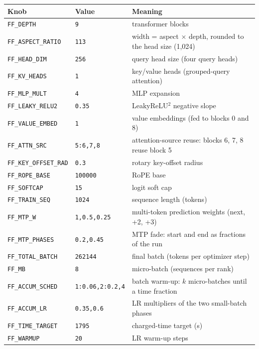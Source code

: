 {\footnotesize
\begin{tabular}{@{}lp{3.2cm}p{7.6cm}@{}}
\toprule
Knob & Value & Meaning \\
\midrule
\texttt{FF\_DEPTH} & \texttt{9} & transformer blocks \\
\texttt{FF\_ASPECT\_RATIO} & \texttt{113} & width = aspect $\times$ depth, rounded to the head size (1{,}024) \\
\texttt{FF\_HEAD\_DIM} & \texttt{256} & query head size (four query heads) \\
\texttt{FF\_KV\_HEADS} & \texttt{1} & key/value heads (grouped-query attention) \\
\texttt{FF\_MLP\_MULT} & \texttt{4} & MLP expansion \\
\texttt{FF\_LEAKY\_RELU2} & \texttt{0.35} & LeakyReLU$^2$ negative slope \\
\texttt{FF\_VALUE\_EMBED} & \texttt{1} & value embeddings (fed to blocks 0 and 8) \\
\texttt{FF\_ATTN\_SRC} & \texttt{5:6,7,8} & attention-source reuse: blocks 6, 7, 8 reuse block 5 \\
\texttt{FF\_KEY\_OFFSET\_RAD} & \texttt{0.3} & rotary key-offset radius \\
\texttt{FF\_ROPE\_BASE} & \texttt{100000} & RoPE base \\
\texttt{FF\_SOFTCAP} & \texttt{15} & logit soft cap \\
\texttt{FF\_TRAIN\_SEQ} & \texttt{1024} & sequence length (tokens) \\
\texttt{FF\_MTP\_W} & \texttt{1,0.5,0.25} & multi-token prediction weights (next, +2, +3) \\
\texttt{FF\_MTP\_PHASES} & \texttt{0.2,0.45} & MTP fade: start and end as fractions of the run \\
\texttt{FF\_TOTAL\_BATCH} & \texttt{262144} & final batch (tokens per optimizer step) \\
\texttt{FF\_MB} & \texttt{8} & micro-batch (sequences per rank) \\
\texttt{FF\_ACCUM\_SCHED} & \texttt{1:0.06,2:0.2,4} & batch warm-up: $k$ micro-batches until a time fraction \\
\texttt{FF\_ACCUM\_LR} & \texttt{0.35,0.6} & LR multipliers of the two small-batch phases \\
\texttt{FF\_TIME\_TARGET} & \texttt{1795} & charged-time target (s) \\
\texttt{FF\_WARMUP} & \texttt{20} & LR warm-up steps \\

\end{tabular}}
